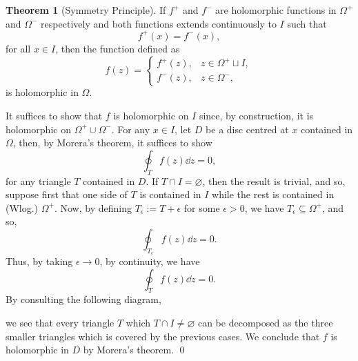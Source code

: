 \documentclass[
]{article}
\theoremstyle{definition}
\newtheorem{theorem}{Theorem}
\theoremstyle{definition}
\begin{document}
\begin{theorem}[Symmetry Principle]
  If \(f^+\) and \(f^-\) are holomorphic functions in \(\Omega^+\) and \(\Omega^-\) 
  respectively and both functions extends continuously to \(I\) such that 
  \[f^+(x) = f^-(x),\]
  for all \(x \in I\), then the function defined as 
  \[f(z) = 
    \begin{cases}
      f^+(z), & z \in \Omega^+ \sqcup I,\\
      f^-(z), & z \in \Omega^-,
    \end{cases}\]
  is holomorphic in \(\Omega\).
\end{theorem}
\proof

It suffices to show that \(f\) is holomorphic on \(I\) since, by
construction, it is holomorphic on \(\Omega^+ \cup \Omega^-\). For any
\(x \in I\), let \(D\) be a disc centred at \(x\) contained in
\(\Omega\), then, by Morera's theorem, it suffices to show
\[\oint_T f(z) \dd z = 0,\] for any triangle \(T\) contained in \(D\).
If \(T \cap I = \varnothing\), then the result is trivial, and so,
suppose first that one side of \(T\) is contained in \(I\) while the
rest is contained in (Wlog.) \(\Omega^+\). Now, by defining
\(T_\epsilon := T + \epsilon\) for some \(\epsilon > 0\), we have
\(T_\epsilon \subseteq \Omega^+\), and so,
\[\oint_{T_\epsilon} f(z) \dd z = 0.\] Thus, by taking
\(\epsilon \to 0\), by continuity, we have \[\oint_T f(z) \dd z = 0.\]
By consulting the following diagram,

\begin{center}
  \end{center}

we see that every triangle \(T\) which \(T \cap I \neq \varnothing\) can
be decomposed as the three smaller triangles which is covered by the
previous cases. We conclude that \(f\) is holomorphic in \(D\) by
Morera's theorem. \qed
\end{document}
